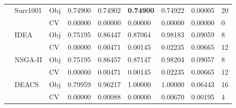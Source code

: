 \begin{table*}[!htb]
\begin{tabular}{lllllllll}
		& \multirow{2}{*}{Surr1001}          & Obj                                & 0.74900                            & 0.74902                            & \textbf{0.74900}                     & 0.74922                             & 0.00005                           & 20               \\
		&                                    & CV                                 & 0.00000                            & 0.00000                            & 0.00000                              & 0.00000                             & 0.00000                           & 0                \\
		& \multirow{2}{*}{IDEA}              & Obj                                & 0.75195                            & 0.86447                            & 0.87064                              & 0.98183                             & 0.09059                           & 8                \\
		&                                    & CV                                 & 0.00000                            & 0.00471                            & 0.00145                              & 0.02235                             & 0.00665                           & 12               \\
		& \multirow{2}{*}{NSGA-II}           & Obj                                & 0.75195                            & 0.86457                            & 0.87147                              & 0.98204                             & 0.09057                           & 8                \\
		&                                    & CV                                 & 0.00000                            & 0.00471                            & 0.00145                              & 0.02235                             & 0.00665                           & 12               \\
		& \multirow{2}{*}{DEACS}             & Obj                                & 0.79959                            & 0.96217                            & 1.00000                              & 1.00000                             & 0.06443                           & 16               \\
		&                                    & CV                                 & 0.00000                            & 0.00088                            & 0.00000                              & 0.00670                             & 0.00195                           & 4                \\

\end{tabular}
\end{table*}
